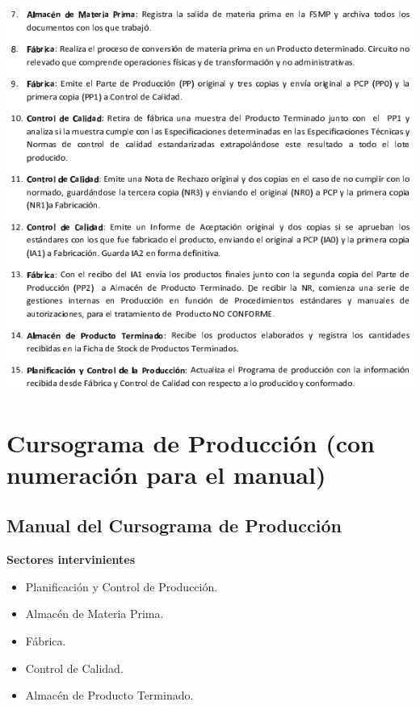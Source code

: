 \begin{center}
 \includegraphics{./Circuitos-Teoricos/Produccion/Images/procedimiento-produccion-2.png}
\end{center}

\pagebreak
\section{Cursograma de Producci\'on (con numeración para el manual)}
\subsection{Manual del Cursograma de Producci\'on}

\begin{center}\textbf{Sectores intervinientes}\end{center}
\begin{itemize}
  \item Planificaci\'on y Control de Producci\'on.
  \item Almac\'en de Materia Prima.
  \item F\'abrica.
  \item Control de Calidad.
  \item Almac\'en de Producto Terminado.
\end{itemize}


